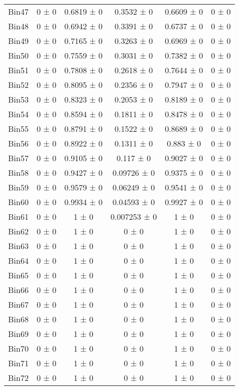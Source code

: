 \begin{tabular}{@{\extracolsep{4pt}}lccccc@{}}
     Bin47 & 0 ± 0 & 0.6819 ± 0 & 0.3532 ± 0 & 0.6609 ± 0 & 0 ± 0 \\ 
     Bin48 & 0 ± 0 & 0.6942 ± 0 & 0.3391 ± 0 & 0.6737 ± 0 & 0 ± 0 \\ 
     Bin49 & 0 ± 0 & 0.7165 ± 0 & 0.3263 ± 0 & 0.6969 ± 0 & 0 ± 0 \\ 
     Bin50 & 0 ± 0 & 0.7559 ± 0 & 0.3031 ± 0 & 0.7382 ± 0 & 0 ± 0 \\ 
     Bin51 & 0 ± 0 & 0.7808 ± 0 & 0.2618 ± 0 & 0.7644 ± 0 & 0 ± 0 \\ 
     Bin52 & 0 ± 0 & 0.8095 ± 0 & 0.2356 ± 0 & 0.7947 ± 0 & 0 ± 0 \\ 
     Bin53 & 0 ± 0 & 0.8323 ± 0 & 0.2053 ± 0 & 0.8189 ± 0 & 0 ± 0 \\ 
     Bin54 & 0 ± 0 & 0.8594 ± 0 & 0.1811 ± 0 & 0.8478 ± 0 & 0 ± 0 \\ 
     Bin55 & 0 ± 0 & 0.8791 ± 0 & 0.1522 ± 0 & 0.8689 ± 0 & 0 ± 0 \\ 
     Bin56 & 0 ± 0 & 0.8922 ± 0 & 0.1311 ± 0 & 0.883 ± 0 & 0 ± 0 \\ 
     Bin57 & 0 ± 0 & 0.9105 ± 0 & 0.117 ± 0 & 0.9027 ± 0 & 0 ± 0 \\ 
     Bin58 & 0 ± 0 & 0.9427 ± 0 & 0.09726 ± 0 & 0.9375 ± 0 & 0 ± 0 \\ 
     Bin59 & 0 ± 0 & 0.9579 ± 0 & 0.06249 ± 0 & 0.9541 ± 0 & 0 ± 0 \\ 
     Bin60 & 0 ± 0 & 0.9934 ± 0 & 0.04593 ± 0 & 0.9927 ± 0 & 0 ± 0 \\ 
     Bin61 & 0 ± 0 & 1 ± 0 & 0.007253 ± 0 & 1 ± 0 & 0 ± 0 \\ 
     Bin62 & 0 ± 0 & 1 ± 0 & 0 ± 0 & 1 ± 0 & 0 ± 0 \\ 
     Bin63 & 0 ± 0 & 1 ± 0 & 0 ± 0 & 1 ± 0 & 0 ± 0 \\ 
     Bin64 & 0 ± 0 & 1 ± 0 & 0 ± 0 & 1 ± 0 & 0 ± 0 \\ 
     Bin65 & 0 ± 0 & 1 ± 0 & 0 ± 0 & 1 ± 0 & 0 ± 0 \\ 
     Bin66 & 0 ± 0 & 1 ± 0 & 0 ± 0 & 1 ± 0 & 0 ± 0 \\ 
     Bin67 & 0 ± 0 & 1 ± 0 & 0 ± 0 & 1 ± 0 & 0 ± 0 \\ 
     Bin68 & 0 ± 0 & 1 ± 0 & 0 ± 0 & 1 ± 0 & 0 ± 0 \\ 
     Bin69 & 0 ± 0 & 1 ± 0 & 0 ± 0 & 1 ± 0 & 0 ± 0 \\ 
     Bin70 & 0 ± 0 & 1 ± 0 & 0 ± 0 & 1 ± 0 & 0 ± 0 \\ 
     Bin71 & 0 ± 0 & 1 ± 0 & 0 ± 0 & 1 ± 0 & 0 ± 0 \\ 
     Bin72 & 0 ± 0 & 1 ± 0 & 0 ± 0 & 1 ± 0 & 0 ± 0 \\ 

\end{tabular}

